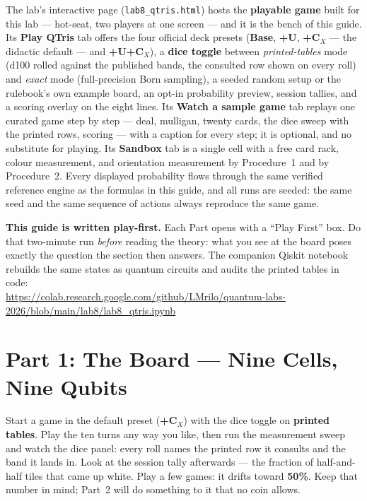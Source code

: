 \documentclass[a4paper,11pt]{article}
\begin{document}
\begin{simulatorbox}
The lab's interactive page (\texttt{lab8\_qtris.html}) hosts the \textbf{playable
game} built for this lab --- hot-seat, two players at one screen --- and it is the bench
of this guide. Its \textbf{Play QTris} tab offers the four official deck presets
(\textbf{Base}, \textbf{+U}, \textbf{+C$_X$} --- the didactic default ---
and \textbf{+U+C$_X$}), a \textbf{dice toggle} between \emph{printed-tables} mode
(d100 rolled against the published bands, the consulted row shown on every roll) and
\emph{exact} mode (full-precision Born sampling), a seeded random setup or the
rulebook's own example board, an opt-in probability preview, session tallies, and a
scoring overlay on the eight lines. Its \textbf{Watch a sample game} tab replays one
curated game step by step --- deal, mulligan, twenty cards, the dice sweep with the
printed rows, scoring --- with a caption for every step; it is optional, and no
substitute for playing. Its \textbf{Sandbox} tab is a single cell with a
free card rack, colour measurement, and orientation measurement by Procedure~1 and by
Procedure~2. Every displayed probability flows through the same verified reference
engine as the formulas in this guide, and all runs are seeded: the same seed and the
same sequence of actions always reproduce the same game.

\medskip
\textbf{This guide is written play-first.} Each Part opens with a ``Play First'' box.
Do that two-minute run \emph{before} reading the theory: what you see at the board
poses exactly the question the section then answers. The companion Qiskit notebook
rebuilds the same states as quantum circuits and audits the printed tables in code:\\[4pt]
\url{https://colab.research.google.com/github/LMrilo/quantum-labs-2026/blob/main/lab8/lab8_qtris.ipynb}
\end{simulatorbox}

\newpage

\section{Part 1: The Board --- Nine Cells, Nine Qubits}

\begin{playbox}
Start a game in the default preset (\textbf{+C$_X$}) with the dice toggle on
\textbf{printed tables}. Play the ten turns any way you like, then run the measurement
sweep and watch the dice panel: every roll names the printed row it consults and the
band it lands in. Look at the session tally afterwards --- the fraction of half-and-half
tiles that came up white. Play a few games: it drifts toward \textbf{50\%}. Keep that
number in mind; Part~2 will do something to it that no coin allows.
\end{playbox}
\end{document}

